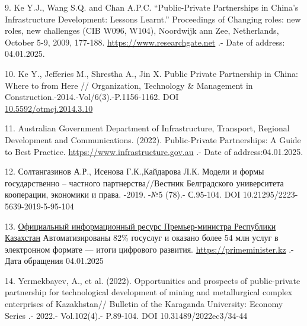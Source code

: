 \begin{references}
9. Ke Y.J., Wang S.Q. and Chan A.P.C. ``Public-Private Partnerships in
China's Infrastructure Development: Lessons Learnt.'' Proceedings of
Changing roles: new roles, new challenges (CIB W096, W104), Noordwijk
ann Zee, Netherlands, October 5-9, 2009, 177-188.
\href{https://www.researchgate.net/publication}{https://www.researchgate.net} .- Date of address:\\
04.01.2025.

10. Ke Y., Jefferies M., Shrestha A., Jin X. Public Private Partnership
in China: Where to from Here // Organization, Technology \& Management in
Construction.-2014.-Vol/6(3).-P.1156-1162. DOI\\
\href{http://dx.doi.org/10.5592/otmcj.2014.3.10}{10.5592/otmcj.2014.3.10}

11. Australian Government Department of Infrastructure, Transport,
Regional Development and Commun\-ications. (2022). Public-Private
Partnerships: A Guide to Best Practice.
\href{https://www.infrastructure.gov.au/infrastructure-transport}{https://www.infrastructure.gov.au} .- Date of address:04.01.2025.

12. Солтангазинов А.Р., Исенова Г.К.,Кайдарова Л.К. Модели и формы
государственно -- частного партнерства//Вестник Белградского
университета кооперации, экономики и права. -2019. -№5 (78).- С.95-104.
DOI 10.21295/2223-5639-2019-5-95-104

13. \href{https://primeminister.kz/ru}{Официальный информационный ресурс
Премьер-министра Республики Казахстан} Автоматизированы 82\% госуслуг и
оказано более 54 млн услуг в электронном формате --- итоги цифрового
развития. \href{https://primeminister.kz/ru/news}{https://primeminister.kz} .- Дата
обращения 04.01.2025

14. Yermekbayev, A., et al. (2022). Opportunities and prospects of
public-private partnership for technolog\-ical development of mining and
metallurgical complex enterprises of Kazakhstan// Bulletin of the
Karag\-anda University: Economy Series .- 2022.- Vol.102(4).-
P.89-104. DOI 10.31489/2022ec3/34-44
\end{references}


